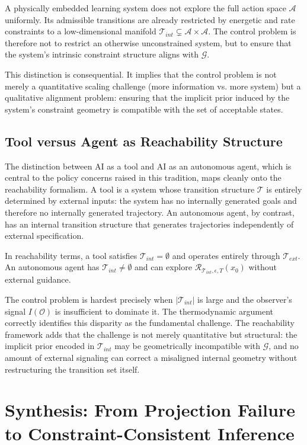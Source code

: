 \documentclass[12pt]{article}
\theoremstyle{plain}
\theoremstyle{definition}
\theoremstyle{remark}
\begin{document}
A physically embedded learning system does not explore the full action space $\mathcal{A}$ uniformly. Its admissible transitions are already restricted by energetic and rate constraints to a low-dimensional manifold $\mathcal{T}_{int} \subsetneq \mathcal{A} \times \mathcal{A}$. The control problem is therefore not to restrict an otherwise unconstrained system, but to ensure that the system's intrinsic constraint structure aligns with $\mathcal{G}$.

This distinction is consequential. It implies that the control problem is not merely a quantitative scaling challenge (more information vs. more system) but a qualitative alignment problem: ensuring that the implicit prior induced by the system's constraint geometry is compatible with the set of acceptable states.

\subsection{Tool versus Agent as Reachability Structure}

The distinction between AI as a tool and AI as an autonomous agent, which is central to the policy concerns raised in this tradition, maps cleanly onto the reachability formalism. A tool is a system whose transition structure $\mathcal{T}$ is entirely determined by external inputs: the system has no internally generated goals and therefore no internally generated trajectory. An autonomous agent, by contrast, has an internal transition structure that generates trajectories independently of external specification.

In reachability terms, a tool satisfies $\mathcal{T}_{int} = \emptyset$ and operates entirely through $\mathcal{T}_{ext}$. An autonomous agent has $\mathcal{T}_{int} \neq \emptyset$ and can explore $\mathcal{R}_{\mathcal{T}_{int}, \epsilon, T}(x_0)$ without external guidance.

The control problem is hardest precisely when $|\mathcal{T}_{int}|$ is large and the observer's signal $I(\mathcal{O})$ is insufficient to dominate it. The thermodynamic argument correctly identifies this disparity as the fundamental challenge. The reachability framework adds that the challenge is not merely quantitative but structural: the implicit prior encoded in $\mathcal{T}_{int}$ may be geometrically incompatible with $\mathcal{G}$, and no amount of external signaling can correct a misaligned internal geometry without restructuring the transition set itself.

\section{Synthesis: From Projection Failure to Constraint-Consistent Inference}
\end{document}
